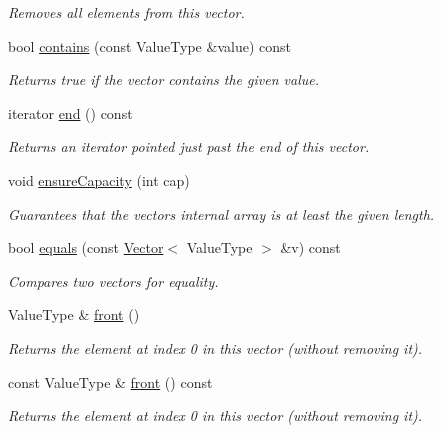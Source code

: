 \begin{DoxyCompactItemize}
\begin{DoxyCompactList}\small\item\em Removes all elements from this vector. \end{DoxyCompactList}\item 
bool \mbox{\hyperlink{classVector_a6fbc1a150987e7e5320d244a3baeb560}{contains}} (const Value\+Type \&value) const
\begin{DoxyCompactList}\small\item\em Returns true if the vector contains the given value. \end{DoxyCompactList}\item 
iterator \mbox{\hyperlink{classVector_a68b688a51bd0cf6fb5bc2cba292209a8}{end}} () const
\begin{DoxyCompactList}\small\item\em Returns an iterator pointed just past the end of this vector. \end{DoxyCompactList}\item 
void \mbox{\hyperlink{classVector_a9552fd9e921fc047fdd59e59d82e88ef}{ensure\+Capacity}} (int cap)
\begin{DoxyCompactList}\small\item\em Guarantees that the vector\textquotesingle{}s internal array is at least the given length. \end{DoxyCompactList}\item 
bool \mbox{\hyperlink{classVector_ad25fe1a007a2f00611d831198a1a86ea}{equals}} (const \mbox{\hyperlink{classVector}{Vector}}$<$ Value\+Type $>$ \&v) const
\begin{DoxyCompactList}\small\item\em Compares two vectors for equality. \end{DoxyCompactList}\item 
Value\+Type \& \mbox{\hyperlink{classVector_a736a6bda35a26620407e175bee46ae4a}{front}} ()
\begin{DoxyCompactList}\small\item\em Returns the element at index 0 in this vector (without removing it). \end{DoxyCompactList}\item 
const Value\+Type \& \mbox{\hyperlink{classVector_a02aaa52ad7a120201f6dd3e90eff737f}{front}} () const
\begin{DoxyCompactList}\small\item\em Returns the element at index 0 in this vector (without removing it). \end{DoxyCompactList}\item 

\end{DoxyCompactItemize}
